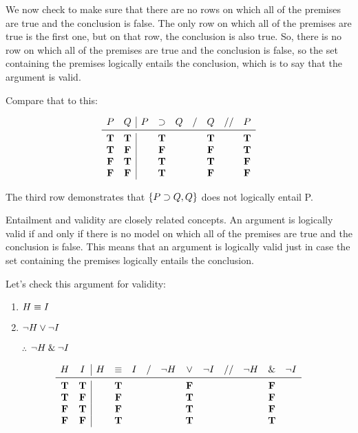 \documentclass[../logic-text.tex]{subfiles}
\begin{document}
We now check to make sure that there are no rows on which all of the premises are true and the conclusion is false.
The only row on which all of the premises are true is the first one, but on that row, the conclusion is also true.
So, there is no row on which all of the premises are true and the conclusion is false, so the set containing the premises logically entails the conclusion, which is to say that the argument is valid.

Compare that to this:

\[
  \begin{array}{cc|ccccccc}
    P & Q & P & \lif & Q & / & Q & // & P \\ \midrule
    \true & \true & &\true &&& \true && \true \\
    \true & \false  && \false &&& \false && \true \\
    \false & \true & &\true &&& \true &&  \false \\
    \false & \false  && \true &&& \false && \false \\
  \end{array}
\]

\noindent The third row demonstrates that \(\{P \supset Q, Q\}\) does not logically entail P.

Entailment and validity are closely related concepts.
An argument is logically valid if and only if there is no model on which all of the premises are true and the conclusion is false.
This means that an argument is logically valid just in case the set containing the premises logically entails the conclusion.

Let's check this argument for validity:

\begin{enumerate}
	\item \(H \equiv I\)
	\item \underline{\(\neg H \lor \neg I\)}
	\item [$\therefore$] \(\neg H \mathbin{\&} \neg I\)
\end{enumerate}


\[
  \begin{array}{cc|ccccccccccc}
    H & I & H & \liff & I & / & \lneg H & \lor & \lneg I & // & \lneg H & \land & \lneg I \\ \midrule
      \true & \true && \true &&&& \false &&&& \false & \\
      \true & \false && \false &&&& \true &&&& \false & \\
      \false & \true && \false &&&& \true &&&& \false & \\
      \false & \false && \true &&&& \true &&&& \true & \\
  \end{array}
\]
\end{document}
